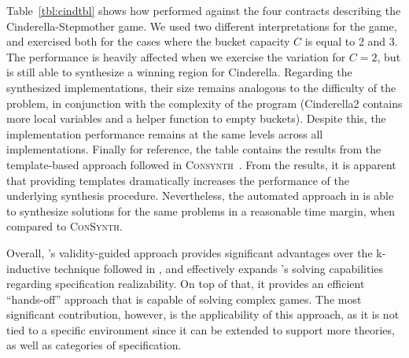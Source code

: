Table~\ref{tbl:cindtbl} shows how \jsynvg performed against the four contracts describing the Cinderella-Stepmother game. We used two different interpretations for the game, and exercised both for the cases where the bucket capacity $C$ is equal to 2 and 3. The performance is heavily affected when we exercise the variation for $C=2$, but \jsynvg is still able to synthesize a winning region for Cinderella. Regarding the synthesized implementations, their size remains analogous to the difficulty of the problem, in conjunction with the complexity of the program (Cinderella2 contains more local variables and a helper function to empty buckets). Despite this, the implementation performance remains at the same levels across all implementations. Finally for reference, the table contains the results from the template-based approach followed in \textsc{Consynth}~\cite{beyene2014constraint}. From the results, it is apparent that providing templates dramatically increases the performance of the underlying synthesis procedure. Nevertheless, the automated approach in \jsynvg is able to synthesize solutions for the same problems in a reasonable time margin, when compared to \textsc{ConSynth}.


Overall, \jsynvg's validity-guided approach provides significant advantages
over the k-inductive technique followed in \jsyn, and effectively expands
\jkind's solving capabilities regarding specification realizability. On top of that, it provides an efficient ``hands-off'' approach that is capable of solving complex games.
The most significant contribution, however, is the applicability of this approach, as it is not tied to a specific environment since it can be extended to support more
theories, as well as categories of specification.
